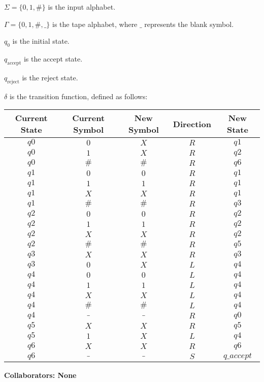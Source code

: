 \documentclass[12 pt]{article}
\begin{document}
\( \Sigma = \{ 0, 1, \# \} \) is the input alphabet.


\( \Gamma = \{ 0, 1, \#, \_ \} \) is the tape alphabet, where \( \_ \) represents the blank symbol.


\( q_0 \) is the initial state.


\( q_{\text{accept}} \) is the accept state.


\( q_{\text{reject}} \) is the reject state.


\( \delta \) is the transition function, defined as follows:


\begin{center}
\begin{tabular}{|c|c|c|c|c|}
\hline
Current State & Current Symbol & New Symbol & Direction & New State \\
\hline
$q0$ & $0$   & $X$   & $R$ & $q1$ \\
$q0$ & $1$   & $X$   & $R$ & $q2$ \\
$q0$ & $\#$  & $\#$  & $R$ & $q6$ \\
\hline
$q1$ & $0$   & $0$   & $R$ & $q1$ \\
$q1$ & $1$   & $1$   & $R$ & $q1$ \\
$q1$ & $X$   & $X$   & $R$ & $q1$ \\
$q1$ & $\#$  & $\#$  & $R$ & $q3$ \\
\hline
$q2$ & $0$   & $0$   & $R$ & $q2$ \\
$q2$ & $1$   & $1$   & $R$ & $q2$ \\
$q2$ & $X$   & $X$   & $R$ & $q2$ \\
$q2$ & $\#$  & $\#$  & $R$ & $q5$ \\
\hline
$q3$ & $X$   & $X$   & $R$ & $q3$ \\
$q3$ & $0$   & $X$   & $L$ & $q4$ \\
\hline
$q4$ & $0$   & $0$   & $L$ & $q4$ \\
$q4$ & $1$   & $1$   & $L$ & $q4$ \\
$q4$ & $X$   & $X$   & $L$ & $q4$ \\
$q4$ & $\#$  & $\#$  & $L$ & $q4$ \\
$q4$ & $\_$  & $\_$  & $R$ & $q0$ \\
\hline
$q5$ & $X$   & $X$   & $R$ & $q5$ \\
$q5$ & $1$   & $X$   & $L$ & $q4$ \\
\hline
$q6$ & $X$   & $X$   & $R$ & $q6$ \\
$q6$ & $\_$  & $\_$  & $S$ & $q\_accept$ \\
\hline
\end{tabular}
\end{center}


\noindent\textbf{Collaborators: None}
\end{document}
